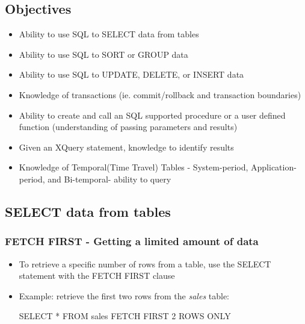 \documentclass{article}
\begin{document}
\subsection{Objectives}
\begin{itemize}
\item Ability to use SQL to SELECT data from tables
\item Ability to use SQL to SORT or GROUP data
\item Ability to use SQL to UPDATE, DELETE, or INSERT data
\item Knowledge of transactions (ie. commit/rollback and transaction boundaries)
\item Ability to create and call an SQL supported procedure or a user defined function (understanding
of passing parameters and results)
\item Given an XQuery statement, knowledge to identify results
\item Knowledge of Temporal(Time Travel) Tables - System-period, Application-period, and Bi-temporal-
ability to query
\end{itemize}

\subsection{SELECT data from tables}
\subsubsection{FETCH FIRST - Getting a limited amount of data}
\begin{itemize}
\item To retrieve a specific number of rows from a table, use the SELECT statement with the FETCH FIRST
clause
\item Example: retrieve the first two rows from the \textit{sales} table:
\begin{sqlcode}
SELECT * FROM sales FETCH FIRST 2 ROWS ONLY
\end{sqlcode}
\end{itemize}













%
%
\end{document}
